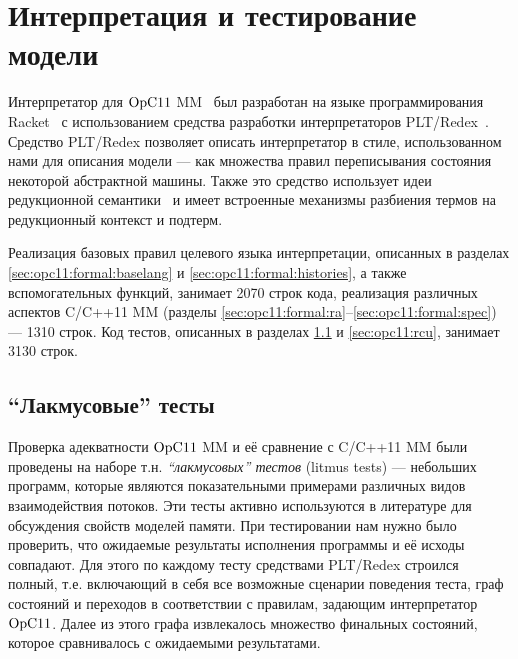 \section{Интерпретация и тестирование модели}
\label{sec:opc11:interpreter}
Интерпретатор для $\mathrm{OpC11}$ MM~\cite{opCppCode} был разработан на языке программирования Racket~\cite{Flatt-PLT:TR10,RacketLang}
с использованием средства разработки интерпретаторов PLT/Redex~\cite{Klein-al:POPL12,Felleisen-al:BOOK09}.
Средство PLT/Redex позволяет описать интерпретатор в стиле, использованном нами для описания модели ---
как множества правил переписывания состояния некоторой абстрактной машины.
Также это средство использует идеи редукционной семантики~\cite{Klein-al:POPL12,Felleisen-al:BOOK09,Felleisen-Hieb:TCS92}
и имеет встроенные механизмы разбиения термов на редукционный контекст и подтерм.

Реализация базовых правил целевого языка интерпретации, описанных в разделах
\ref{sec:opc11:formal:baselang} и \ref{sec:opc11:formal:histories}, а также вспомогательных функций, занимает
2070 строк кода, реализация различных аспектов C/C++11 MM
(разделы \ref{sec:opc11:formal:ra}--\ref{sec:opc11:formal:spec})
--- 1310 строк.
Код тестов, описанных в разделах \ref{sec:opc11:litmus} и \ref{sec:opc11:rcu}, занимает 3130 строк.

\subsection{``Лакмусовые'' тесты}
\label{sec:opc11:litmus}
Проверка адекватности $\mathrm{OpC11}$ MM и её сравнение с C/C++11 MM
были проведены на наборе т.н. \emph{``лакмусовых'' тестов} (litmus tests) --- небольших программ, которые
являются показательными примерами различных видов взаимодействия потоков. Эти тесты активно используются в литературе
\cite{Bornat-al:LACE,Batty-al:POPL11,Lahav-al:POPL16,Maranget-al:tutorial,Turon-al:OOPSLA14}
для обсуждения свойств моделей памяти.
При тестировании нам нужно было проверить, что ожидаемые результаты
исполнения программы и её исходы совпадают.
Для этого по каждому тесту средствами PLT/Redex строился полный, т.е. включающий в себя все возможные сценарии
поведения теста, граф состояний и переходов в соответствии с правилам, задающим интерпретатор $\mathrm{OpC11}$.
Далее из этого графа извлекалось множество финальных состояний, которое сравнивалось с ожидаемыми результатами.

